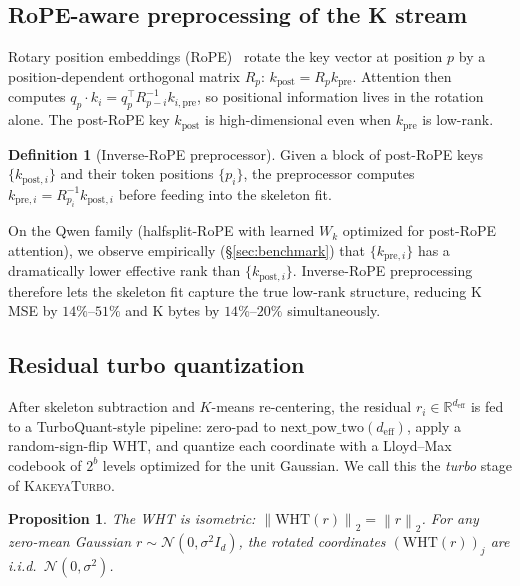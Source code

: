 \documentclass[11pt,a4paper]{article}
\theoremstyle{definition}
\newtheorem{definition}{Definition}[section]
\theoremstyle{plain}
\newtheorem{proposition}[theorem]{Proposition}
\newcommand{\R}{\mathbb{R}}
\newcommand{\norm}[1]{\left\lVert#1\right\rVert}
\begin{document}
\subsection{RoPE-aware preprocessing of the K stream}
\label{sec:rope}

Rotary position embeddings (RoPE)~\cite{rope} rotate the key vector at position $p$ by a position-dependent orthogonal matrix $R_p$: $k_{\text{post}} = R_p k_{\text{pre}}$. Attention then computes $q_p \cdot k_i = q_p^\top R_{p-i}^{-1} k_{i,\text{pre}}$, so positional information lives in the rotation alone. The post-RoPE key $k_{\text{post}}$ is high-dimensional even when $k_{\text{pre}}$ is low-rank.

\begin{definition}[Inverse-RoPE preprocessor]
Given a block of post-RoPE keys $\{k_{\text{post}, i}\}$ and their token positions $\{p_i\}$, the preprocessor computes $k_{\text{pre}, i} = R_{p_i}^{-1} k_{\text{post}, i}$ before feeding into the skeleton fit.
\end{definition}

On the Qwen family (halfsplit-RoPE with learned $W_k$ optimized for post-RoPE attention), we observe empirically (\S\ref{sec:benchmark}) that $\{k_{\text{pre}, i}\}$ has a dramatically lower effective rank than $\{k_{\text{post}, i}\}$. Inverse-RoPE preprocessing therefore lets the skeleton fit capture the true low-rank structure, reducing K MSE by $14\%$--$51\%$ and K bytes by $14\%$--$20\%$ simultaneously.

\subsection{Residual turbo quantization}

After skeleton subtraction and $K$-means re-centering, the residual $r_i \in \R^{d_{\text{eff}}}$ is fed to a TurboQuant-style pipeline: zero-pad to $\text{next\_pow\_two}(d_{\text{eff}})$, apply a random-sign-flip WHT, and quantize each coordinate with a Lloyd--Max codebook of $2^b$ levels optimized for the unit Gaussian. We call this the \emph{turbo} stage of \textsc{KakeyaTurbo}.

\begin{proposition}
The WHT is isometric: $\norm{\mathrm{WHT}(r)}_2 = \norm{r}_2$. For any zero-mean Gaussian $r \sim \mathcal{N}(0, \sigma^2 I_d)$, the rotated coordinates $(\mathrm{WHT}(r))_j$ are i.i.d.\ $\mathcal{N}(0, \sigma^2)$.
\end{proposition}
\end{document}
